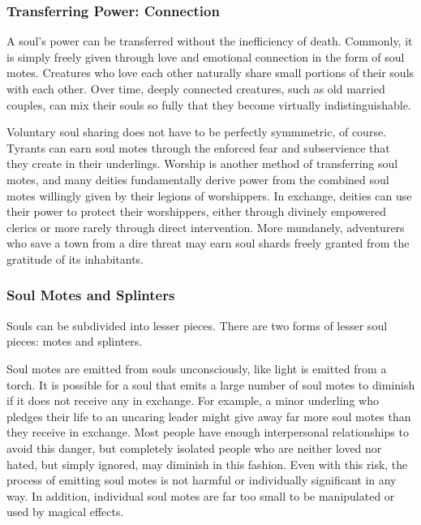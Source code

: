         \subsubsection{Transferring Power: Connection}
            A soul's power can be transferred without the inefficiency of death.
            Commonly, it is simply freely given through love and emotional connection in the form of soul motes.
            Creatures who love each other naturally share small portions of their souls with each other.
            Over time, deeply connected creatures, such as old married couples, can mix their souls so fully that they become virtually indistinguishable.

            Voluntary soul sharing does not have to be perfectly symmmetric, of course.
            Tyrants can earn soul motes through the enforced fear and subservience that they create in their underlings.
            Worship is another method of transferring soul motes, and many deities fundamentally derive power from the combined soul motes willingly given by their legions of worshippers.
            In exchange, deities can use their power to protect their worshippers, either through divinely empowered clerics or more rarely through direct intervention.
            More mundanely, adventurers who save a town from a dire threat may earn soul shards freely granted from the gratitude of its inhabitants.

        \subsubsection{Soul Motes and Splinters}
            Souls can be subdivided into lesser pieces.
            There are two forms of lesser soul pieces: motes and splinters.

            Soul motes are emitted from souls unconsciously, like light is emitted from a torch.
            It is possible for a soul that emits a large number of soul motes to diminish if it does not receive any in exchange.
            For example, a minor underling who pledges their life to an uncaring leader might give away far more soul motes than they receive in exchange.
            Most people have enough interpersonal relationships to avoid this danger, but completely isolated people who are neither loved nor hated, but simply ignored, may diminish in this fashion.
            Even with this risk, the process of emitting soul motes is not harmful or individually significant in any way.
            In addition, individual soul motes are far too small to be manipulated or used by magical effects.

